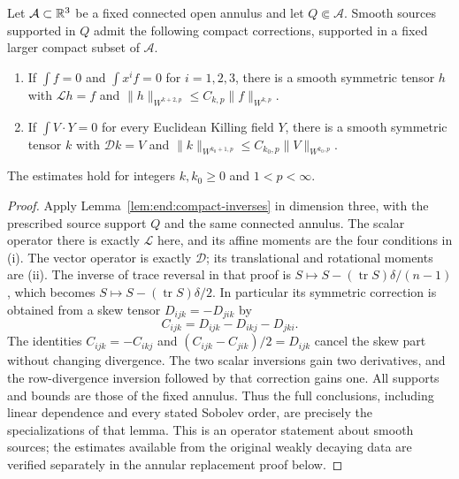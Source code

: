\begin{lemma}
\label{n3:reduction:compact-inverses}
Let $\mathcal A\subset\mathbb R^3$ be a fixed connected open annulus and let
$Q\Subset\mathcal A$.  Smooth sources supported in $Q$ admit the
following compact corrections, supported in a fixed larger compact
subset of $\mathcal A$.
\begin{enumerate}[label=\textup{(\roman*)}]
\item If $\int f=0$ and $\int x^if=0$ for $i=1,2,3$, there is a smooth
      symmetric tensor $h$ with $\mathcal Lh=f$ and
      $\|h\|_{W^{k+2,p}}\le C_{k,p}\|f\|_{W^{k,p}}$.
\item If $\int V\cdot Y=0$ for every Euclidean Killing field $Y$, there
      is a smooth symmetric tensor $k$ with $\mathcal Dk=V$ and
      $\|k\|_{W^{k_0+1,p}}\le C_{k_0,p}\|V\|_{W^{k_0,p}}$.
\end{enumerate}
The estimates hold for integers $k,k_0\ge0$ and $1<p<\infty$.
\end{lemma}

\begin{proof}
Apply Lemma~\ref{lem:end:compact-inverses} in dimension three, with
the prescribed source support $Q$ and the same connected annulus.
The scalar operator there is exactly $\mathcal L$ here, and its affine
moments are the four conditions in (i). The vector operator is exactly
$\mathcal D$; its translational and rotational moments are (ii).
The inverse of trace reversal in that proof is
$S\mapsto S-(\operatorname{tr}S)\delta/(n-1)$, which becomes
$S\mapsto S-(\operatorname{tr}S)\delta/2$. In particular its symmetric
correction is obtained from a skew tensor $D_{ijk}=-D_{jik}$ by
\begin{equation}\label{n3:reduction:stress-symmetrization}
 C_{ijk}=D_{ijk}-D_{ikj}-D_{jki}.
\end{equation}
The identities $C_{ijk}=-C_{ikj}$ and
$(C_{ijk}-C_{jik})/2=D_{ijk}$ cancel the skew part without changing
divergence. The two scalar inversions gain two derivatives, and the
row-divergence inversion followed by that correction gains one.
All supports and bounds are those of the fixed annulus. Thus the full
conclusions, including linear dependence and every stated Sobolev order,
are precisely the specializations of that lemma. This is an operator
statement about smooth sources; the estimates available from the original
weakly decaying data are verified separately in the annular replacement
proof below.
\end{proof}

